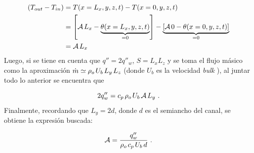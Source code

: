 \begin{equation*}
\begin{aligned}
\left( T_{out} - T_{in} \right) &= T(x=L_x,y,z,t) - T(x=0,y,z,t) \\
								&= \left[ \mathcal{A} \hspace{0.5mm} L_x - \underbrace{\theta(x=L_x,y,z,t)}_{=0} \right] - \underbrace{ \left[ \mathcal{A} \hspace{0.5mm} 0 - \theta(x=0,y,z,t) \right] }_{=0} \\
								&= \mathcal{A} \hspace{0.5mm} L_x
\end{aligned}
\end{equation*}
Luego, si se tiene en cuenta que $q''= 2 q''_w$, $S=L_x L_z$ y se toma el flujo másico como la aproximación  $\dot{m} \simeq \rho_o \hspace{0.5mm} U_b \hspace{0.5mm} L_y \hspace{0.5mm} L_z $ (donde $U_b$ es la velocidad \textit{bulk} \cite{pope2001turbulent}), al juntar todo lo anterior se encuentra que 

$$ 2 q''_w  = c_p \hspace{0.5mm} \rho_o \hspace{0.5mm}  U_b \hspace{0.5mm} \mathcal{A}  \hspace{0.5mm} L_y \text{ .}$$ 
Finalmente, recordando que $L_y = 2 d$, donde $d$ es el semiancho del canal, se obtiene la expresión buscada:

\begin{equation}
\mathcal{A}=\frac{q''_w}{\rho_o \hspace{0.5mm} c_p \hspace{0.5mm} U_b \hspace{0.5mm} d } \text{ .}
\end{equation}








